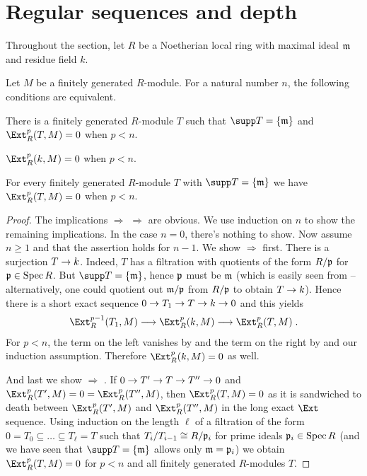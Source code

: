 \documentclass[a4paper,parskip=half,numbers=enddot, DIV=12]{scrreprt}
\begin{document}
\section{Regular sequences and depth}
Throughout the section, let $R$ be a Noetherian local ring with maximal ideal $\mathfrak{m}$ and residue field $k$.
\begin{prop}
	Let $M$ be a finitely generated $R$-module. For a natural number $n$, the following conditions are equivalent.
	\begin{alphanumerate}
		\item There is a finitely generated $R$-module $T$ such that $\supp T=\{\mm\}$ and $\Ext_R^p(T,M)=0$ when $p<n$.
		\item $\Ext_R^p(k,M)=0$ when $p<n$.
		\item For every finitely generated $R$-module $T$ with $\supp T=\{\mm\}$ we have $\Ext_R^p(T,M)=0$ when $p<n$.
	\end{alphanumerate}
\end{prop}
\begin{proof}
	The implications  $\Rightarrow$  $\Rightarrow$  are obvious. We use induction on $n$ to show the remaining implications. In the case $n=0$, there's nothing to show. Now assume $n\geq 1$ and that the assertion holds for $n-1$. We show  $\Rightarrow$  first. There is a surjection $T\morphism k$. Indeed, $T$ has a filtration with quotients of the form $R/\mathfrak{p}$ for $\mathfrak{p}\in\operatorname{Spec} R$. But $\supp T=\{\mm\}$, hence $\mathfrak{p}$ must be $\mathfrak{m}$ (which is easily seen from \cite[Fact~3.1.2 and Lemma~3.4.1]{alg2} -- alternatively, one could quotient out $\mathfrak{m}/\mathfrak{p}$ from $R/\mathfrak{p}$ to obtain $T\morphism k$). Hence there is a short exact sequence $0\morphism T_1\morphism T\morphism k\morphism 0$ and this yields
	\begin{align*}
		\Ext_R^{p-1}(T_1,M)\morphism\Ext_R^p(k,M)\morphism\Ext_R^p(T,M)\;.
	\end{align*}
	For $p<n$, the term on the left vanishes by  and the term on the right by  and our induction assumption. Therefore $\Ext_R^p(k,M)=0$ as well.
	
	And last we show  $\Rightarrow$ . If $0\morphism T'\morphism T\morphism T''\morphism 0$ and $\Ext_R^p(T',M)=0=\Ext_R^p(T'',M)$, then $\Ext_R^p(T,M)=0$ as it is sandwiched to death between $\Ext_R^p(T',M)$ and $\Ext_R^p(T'',M)$ in the long exact $\Ext$ sequence. Using induction on the length $\ell$ of a filtration of the form $0=T_0\subseteq\ldots\subseteq T_\ell=T$ such that $T_i/T_{i-1}\cong R/\mathfrak{p}_i$ for prime ideals $\mathfrak{p}_i\in\operatorname{Spec} R$ (and we have seen that $\supp T=\{\mm\}$ allows only $\mathfrak{m}=\mathfrak{p}_i$) we obtain $\Ext_R^p(T,M)=0$ for $p<n$ and all finitely generated $R$-modules $T$.
\end{proof}
\end{document}
